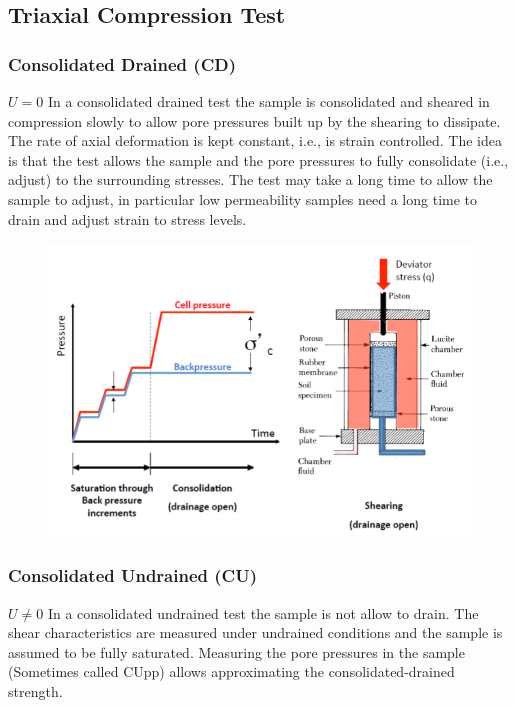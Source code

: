     \subsection{Triaxial Compression Test}
        \subsubsection{Consolidated Drained (CD)}
            
            \textbf{$U = 0$} 
            In a consolidated drained test the sample is consolidated and sheared in compression slowly to allow pore pressures built up by the shearing to dissipate. The rate of axial deformation is kept constant, i.e., is strain controlled. The idea is that the test allows the sample and the pore pressures to fully consolidate (i.e., adjust) to the surrounding stresses. The test may take a long time to allow the sample to adjust, in particular low permeability samples need a long time to drain and adjust strain to stress levels.
            
            \begin{figure}[h!]
            \center
                \includegraphics[scale=0.7]{Verastegui/images/V13.PNG}
            \end{figure}     
            
        \subsubsection{Consolidated Undrained (CU)}
        
            \textbf{$U \ne 0$} 
            In a consolidated undrained test the sample is not allow to drain. The shear characteristics are measured under undrained conditions and the sample is assumed to be fully saturated. Measuring the pore pressures in the sample (Sometimes called CUpp) allows approximating the consolidated-drained strength.
            
